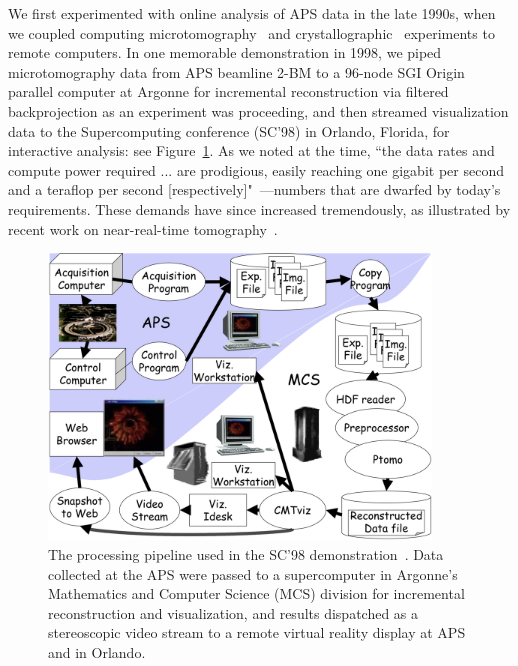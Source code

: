 \documentclass{aip-cp}
\begin{document}
We first experimented with online analysis of APS data in the late 1990s, 
when we coupled 
computing microtomography~\cite{wang1999quasi,wang2001high} and crystallographic~\cite{von2000using}
experiments to remote computers.
In one memorable demonstration in 1998, we piped microtomography data from APS beamline 2-BM to a 
96-node SGI Origin parallel computer 
at Argonne for incremental reconstruction via filtered backprojection as an experiment was 
proceeding,
and then streamed visualization data to the Supercomputing conference (SC'98) in Orlando, Florida, 
for interactive analysis: see Figure~\ref{fig:sc98}. 
As we noted at the time, 
``the data rates and compute power required ... are prodigious, easily reaching one gigabit per 
second and a teraflop per second [respectively]"~\cite{von2000real}---numbers that are dwarfed by 
today's requirements. 
These demands have since increased tremendously, as illustrated by recent work on near-real-time tomography~\cite{Bicer_Europar15,bicer2017real}.

\begin{figure}[h]
  \centerline{\includegraphics[width=4in]{Figs/APS-Fig.png}}
  \caption{The processing pipeline used in the SC'98 demonstration~\cite{von2000real}. Data 
collected at the APS 
  were passed to a supercomputer in Argonne's Mathematics and Computer Science (MCS) division for
  incremental reconstruction and visualization, and results dispatched as a stereoscopic
  video stream to a remote virtual reality display at APS and in Orlando.\label{fig:sc98}}
\end{figure}
\end{document}
